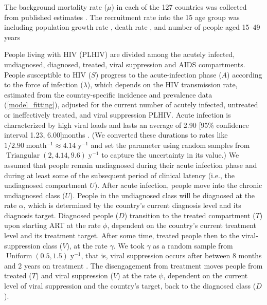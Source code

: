 \documentclass[11pt]{article}
\DeclareMathOperator{\Uniform}{Uniform}
\DeclareMathOperator{\Triangular}{Triangular}
\begin{document}
The background mortality rate ($\mu$) in each of the 127 countries was
collected from published estimates
\cite{World_Development_Indicators2013-ee}.  The recruitment rate into
the 15 age group was 
including population
growth rate \cite{WorldBankpg}, death rate
\cite{World_Development_Indicators2013-ee}, and number of people aged
15--49 years \cite{The_World_Bank2016-fd}

People living with HIV (PLHIV) are divided among the acutely infected,
undiagnosed, diagnosed, treated, viral suppression and AIDS
compartments. People susceptible to HIV ($S$) progress to the
acute-infection phase ($A$) according to the force of infection
($\lambda$), which depends on the HIV transmission rate, estimated
from the country-specific incidence and prevalence data
(\autoref{model_fitting}), adjusted for the current number of acutely
infected, untreated or ineffectively treated, and viral suppression
PLHIV.  Acute infection is characterized by high viral loads and lasts
an average of 2.90 [95\% confidence interval 1.23, 6.00]\;months
\cite{Hollingsworth2008-iy}.  (We converted these durations to rates
like $1 / 2.90\;\text{month$^{-1}$} \approx 4.14\;\text{y$^{-1}$}$ and
set the parameter using random samples from
$\Triangular(2, 4.14, 9.6)\;\text{y$^{-1}$}$ to capture the
uncertainty in its value.)  We assumed that people remain undiagnosed
during their acute infection phase and during at least some of the
subsequent period of clinical latency (i.e., the undiagnosed
compartment $U$). After acute infection, people move into the chronic
undiagnosed class ($U$).  People in the undiagnosed class will be
diagnosed at the rate $\alpha$, which is determined by the country's
current diagnosis level and its diagnosis target.  Diagnosed people
($D$) transition to the treated compartment ($T$) upon starting ART at
the rate $\phi$, dependent on the country's current treatment level
and its treatment target.  After some time, treated people then to the
viral-suppression class ($V$), at the rate $\gamma$.  We took $\gamma$
as a random sample from $\Uniform(0.5, 1.5)\;\text{y$^{-1}$}$, that
is, viral suppression occurs after between 8 months and 2 years on
treatment \cite{Currie2009-yz}.  The disengagement from treatment
moves people from treated ($T$) and viral suppression ($V$) at the
rate $\psi$, dependent on the current level of viral suppression and
the country's target, back to the diagnosed class ($D$).
\end{document}
